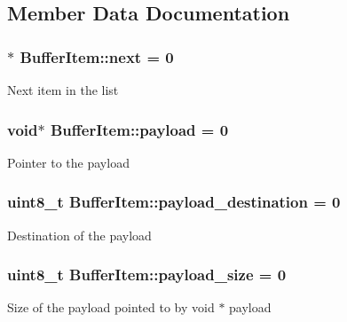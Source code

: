 \subsection{Member Data Documentation}
\subsubsection[{\texorpdfstring{next}{next}}]{$\ast$ Buffer\+Item\+::next = 0}\hypertarget{structBufferItem_a0b7574f1fee48cbb04176af01f9d810f}{}\label{structBufferItem_a0b7574f1fee48cbb04176af01f9d810f}
Next item in the list 
\subsubsection[{\texorpdfstring{payload}{payload}}]{\setlength{\rightskip}{0pt plus 5cm}void$\ast$ Buffer\+Item\+::payload = 0}\hypertarget{structBufferItem_a0ec6d94d7df8c1e9db526fa0200267bb}{}\label{structBufferItem_a0ec6d94d7df8c1e9db526fa0200267bb}
Pointer to the payload 
\subsubsection[{\texorpdfstring{payload\+\_\+destination}{payload_destination}}]{\setlength{\rightskip}{0pt plus 5cm}uint8\+\_\+t Buffer\+Item\+::payload\+\_\+destination = 0}\hypertarget{structBufferItem_a2e475a18a6671f1f0c4bf3010d7a6e89}{}\label{structBufferItem_a2e475a18a6671f1f0c4bf3010d7a6e89}
Destination of the payload 
\subsubsection[{\texorpdfstring{payload\+\_\+size}{payload_size}}]{\setlength{\rightskip}{0pt plus 5cm}uint8\+\_\+t Buffer\+Item\+::payload\+\_\+size = 0}\hypertarget{structBufferItem_a5c3187c383ceec1825964d5e512273de}{}\label{structBufferItem_a5c3187c383ceec1825964d5e512273de}
Size of the payload pointed to by void $\ast$ payload 
